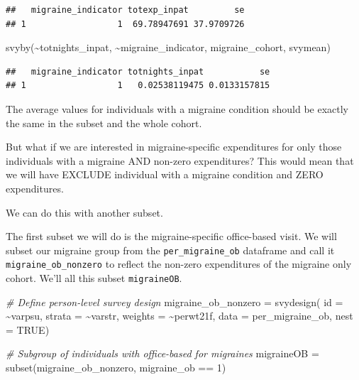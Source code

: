 \documentclass[
]{book}
\newenvironment{Shaded}{\begin{snugshade}}{\end{snugshade}}
\newcommand{\AttributeTok}[1]{\textcolor[rgb]{0.77,0.63,0.00}{#1}}
\newcommand{\CommentTok}[1]{\textcolor[rgb]{0.56,0.35,0.01}{\textit{#1}}}
\newcommand{\ConstantTok}[1]{\textcolor[rgb]{0.00,0.00,0.00}{#1}}
\newcommand{\DecValTok}[1]{\textcolor[rgb]{0.00,0.00,0.81}{#1}}
\newcommand{\FunctionTok}[1]{\textcolor[rgb]{0.00,0.00,0.00}{#1}}
\newcommand{\NormalTok}[1]{#1}
\newcommand{\OtherTok}[1]{\textcolor[rgb]{0.56,0.35,0.01}{#1}}
\newcommand{\SpecialCharTok}[1]{\textcolor[rgb]{0.00,0.00,0.00}{#1}}
\begin{document}
\begin{verbatim}
##   migraine_indicator totexp_inpat         se
## 1                  1  69.78947691 37.9709726
\end{verbatim}

\begin{Shaded}
\begin{Highlighting}[]
\FunctionTok{svyby}\NormalTok{(}\SpecialCharTok{\textasciitilde{}}\NormalTok{totnights\_inpat, }\SpecialCharTok{\textasciitilde{}}\NormalTok{migraine\_indicator, migraine\_cohort, svymean)}
\end{Highlighting}
\end{Shaded}

\begin{verbatim}
##   migraine_indicator totnights_inpat           se
## 1                  1   0.02538119475 0.0133157815
\end{verbatim}

The average values for individuals with a migraine condition should be exactly the same in the subset and the whole cohort.

But what if we are interested in migraine-specific expenditures for only those individuals with a migraine AND non-zero expenditures? This would mean that we will have EXCLUDE individual with a migraine condition and ZERO expenditures.

We can do this with another subset.

The first subset we will do is the migraine-specific office-based visit. We will subset our migraine group from the \texttt{per\_migraine\_ob} dataframe and call it \texttt{migraine\_ob\_nonzero} to reflect the non-zero expenditures of the migraine only cohort. We'll all this subset \texttt{migraineOB}.

\begin{Shaded}
\begin{Highlighting}[]
\CommentTok{\# Define person{-}level survey design}
\NormalTok{migraine\_ob\_nonzero }\OtherTok{=} \FunctionTok{svydesign}\NormalTok{(}
  \AttributeTok{id =} \SpecialCharTok{\textasciitilde{}}\NormalTok{varpsu, }
  \AttributeTok{strata =} \SpecialCharTok{\textasciitilde{}}\NormalTok{varstr,}
  \AttributeTok{weights =} \SpecialCharTok{\textasciitilde{}}\NormalTok{perwt21f,}
  \AttributeTok{data =}\NormalTok{ per\_migraine\_ob,}
  \AttributeTok{nest =} \ConstantTok{TRUE}\NormalTok{)}

\CommentTok{\# Subgroup of individuals with office{-}based for migraines}
\NormalTok{migraineOB }\OtherTok{=} \FunctionTok{subset}\NormalTok{(migraine\_ob\_nonzero, migraine\_ob }\SpecialCharTok{==} \DecValTok{1}\NormalTok{)}
\end{Highlighting}
\end{Shaded}
\end{document}

